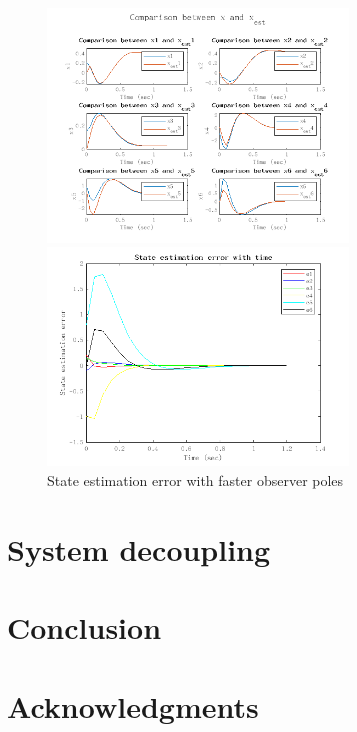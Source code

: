 \documentclass[hyperref]{article}
\theoremstyle{nonumberplain}
\begin{document}
	\begin{figure}[H]
		\centering
		\begin{minipage}[t]{0.48\textwidth}
			\centering
			\includegraphics[width=8cm]{fig28.png}
		\end{minipage}
		\begin{minipage}[t]{0.48\textwidth}
			\centering
			\includegraphics[width=8cm]{fig29.png}
		\end{minipage}
		\caption{State estimation error with faster observer poles}
		\label{fig20}
	\end{figure}
	
	\section{System decoupling}
	
	
	
	
	
	
	
	
	
	
	
	
	
	\section{Conclusion}
	\section*{Acknowledgments}
	
	
	
	{}
	
\end{document}
